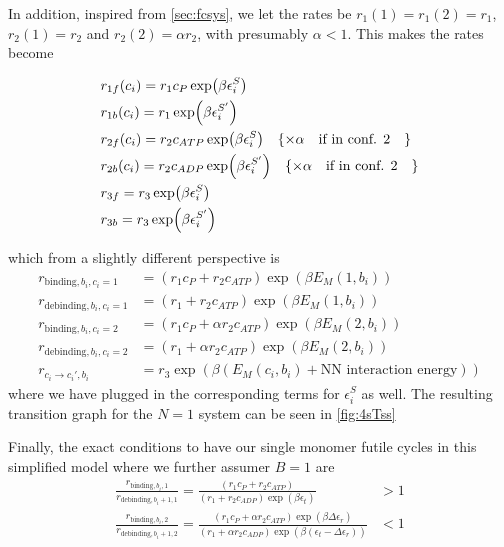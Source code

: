 \documentclass[11pt]{article}
\begin{document}
In addition, inspired from \cref{sec:fcsys}, we let the rates be $r_1(1)=r_1(2)=r_1$, $r_2(1)=r_2$ and $r_2(2)=\alpha r_2$, with presumably $\alpha < 1$.
This makes the rates become
\begin{tcolorbox}
	\begin{align}
		 & r_{1f}(c_i) = r_1c_P\exp(\beta\epsilon_i^S) \label{eq:rate1f}                                                   \\
		 & r_{1b}(c_i) = r_1\exp(\beta\epsilon_i^{S'}) \label{eq:rate1b}                                                   \\
		 & r_{2f}(c_i) = r_2c_{ATP}\exp(\beta\epsilon_i^S) \quad \{\times \alpha \qq{if in conf. 2}\} \label{eq:rate2f}    \\
		 & r_{2b}(c_i) = r_2c_{ADP}\exp(\beta\epsilon_i^{S'}) \quad \{\times \alpha \qq{if in conf. 2}\} \label{eq:rate2b} \\
		 & r_{3f} = r_3\exp(\beta\epsilon_i^S) \label{eq:rate3f}                                                           \\
		 & r_{3b} = r_3\exp(\beta\epsilon_i^{S'}) \label{eq:rate3b}
	\end{align}
\end{tcolorbox}
which from a slightly different perspective is
\begin{align}
	r_{\text{binding},b_i,c_i=1}   & = (r_1c_P+r_2c_{ATP})\exp(\beta E_M(1, b_i))                    \\
	r_{\text{debinding},b_i,c_i=1} & = (r_1+r_2c_{ATP})\exp(\beta E_M(1, b_i))                       \\
	r_{\text{binding},b_i,c_i=2}   & = (r_1c_P+\alpha r_2c_{ATP})\exp(\beta E_M(2, b_i))             \\
	r_{\text{debinding},b_i,c_i=2} & = (r_1+\alpha r_2c_{ATP})\exp(\beta E_M(2, b_i))                \\
	r_{c_i \rightarrow c_i',b_i}   & = r_3\exp(\beta (E_M(c_i, b_i) + \text{NN interaction energy}))
\end{align}
where we have plugged in the corresponding terms for $\epsilon_i^S$ as well.
The resulting transition graph for the $N=1$ system can be seen in \cref{fig:4sTss}

Finally, the exact conditions to have our single monomer futile cycles in this simplified model where we further assumer $B=1$ are
\begin{align}
	\frac{r_{\text{binding},b_i,1}}{r_{\text{debinding},b_i+1,1}} = \frac{(r_1c_P+r_2c_{ATP})}{(r_1+r_2c_{ADP})\exp(\beta \epsilon_t)}                                                              & > 1 \\
	\frac{r_{\text{binding},b_i,2}}{r_{\text{debinding},b_i+1,2}} = \frac{(r_1c_P+\alpha r_2c_{ATP})\exp(\beta \Delta\epsilon_r)}{(r_1+\alpha r_2c_{ADP})\exp(\beta (\epsilon_t-\Delta\epsilon_r))} & < 1 \\
\end{align}
\end{document}

